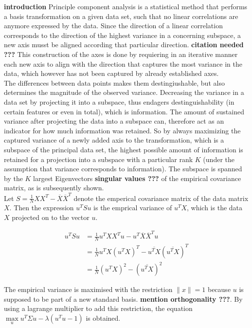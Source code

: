 \documentclass[a4paper, 11pt]{article}
\begin{document}
\textbf{introduction}
Principle component analysis is a statistical method that performs a basis transformation on a given data set, such that no linear correlations are anymore expressed by the data. Since the direction of a linear correlation corresponds to the direction of the highest variance in a concerning subspace, a new axis musst be aligned according that particular direction. \textbf{citation needed ???} This construction of the axes is done by requiering in an iterative manner each new axis to align with the direction that captures the most variance in the data, which however has not been captured by already established axes. \\
The differences between data points makes them destingiushable, but also determines the magnitude of the observed variance. Decreasing the variance in a data set by projecting it into a subspace, thus endagers destinguishability (in certain features or even in total), which is information. The amount of sustained variance after projecting the data into a subspace can, therefore act as an indicator for how much information was retained. So by always maximizing the captured variance of a newly added axis to the transformation, which is a subspace of the principal data set, the highest possible amount of information is retained for a projection into a subspace with a particular rank $K$ (under the assumption that variance corresponds to information). The subspace is spanned by the $K$ largest Eigenvectors \textbf{singular values ???} of the empirical covariance matrix, as is subsequently shown. \\
Let $S = \frac{1}{N}XX^T - \overline{X} \overline{X}^T$ denote the emperical covariance matrix of the data matrix $X$. Then the expression $u^TSu$ is the emprical variance of $u^TX$, which is the data $X$ projected on to the vector $u$.

\begin{align*}
u^T S u & = \frac{1}{N} u^T X X^T u - u^T \overline{X} \overline{X}^T u \\
& = \frac{1}{N} u^T X (u^T X)^T  -  \overline{u^TX} (\overline{u^TX})^T  \\
& = \frac{1}{N} (u^T X)^2 - (\overline{u^TX})^2
\end{align*}

The empirical variance is maximised with the restriction $\parallel x \parallel = 1$ because $u$ is supposed to be part of a new standard basis. \textbf{mention orthogonality ???}. By using a lagrange multiplier to add this restriction, the equation $\max\limits_{u} u^T \Sigma u - \lambda(u^T u - 1)$ is obtained.
\end{document}
